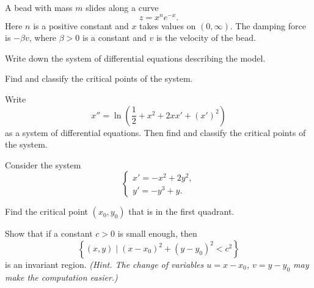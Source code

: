 \documentclass[11pt,oneside]{article}
\begin{document}
\begin{problem}
A bead with mass $m$ slides along a curve
\[
z=x^n e^{-x}.
\]
Here $n$ is a positive constant and $x$ takes values on $(0,\infty)$. The damping force is $-\beta v$, where $\beta>0$ is a constant and $v$ is the velocity of the bead.
\begin{problemsubparts}
\item Write down the system of differential equations describing the model.
\item Find and classify the critical points of the system.
\end{problemsubparts}
\end{problem}

\begin{problem}
Write
\[
x''=\ln\left(\frac12+x^2+2xx'+(x')^2\right)
\]
as a system of differential equations. Then find and classify the critical points of the system.
\end{problem}

\begin{problem}
Consider the system
\[
\begin{cases}
x'=-x^2+2y^2,\\
y'=-y^3+y.
\end{cases}
\]
\begin{problemsubparts}
\item Find the critical point $(x_0,y_0)$ that is in the first quadrant.
\item Show that if a constant $c>0$ is small enough, then
\[
\left\{(x,y)\mid (x-x_0)^2+(y-y_0)^2<c^2\right\}
\]
is an invariant region. \textit{(Hint. The change of variables $u=x-x_0$, $v=y-y_0$ may make the computation easier.)}
\end{problemsubparts}
\end{problem}
\end{document}
